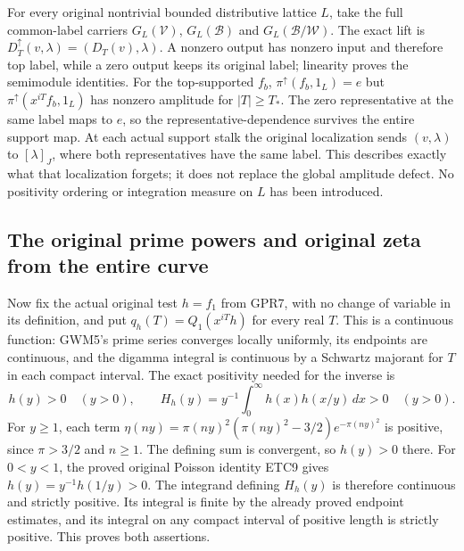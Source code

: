 For every original nontrivial bounded distributive lattice
$L$, take the full common-label carriers
$G_L(\mathcal V)$, $G_L(\mathcal B)$ and
$G_L(\mathcal B/\mathcal W)$.
The exact lift is
$D_T^\uparrow(v,\lambda)=(D_T(v),\lambda)$.
A nonzero output has nonzero input and therefore top
label, while a zero output keeps its original label;
linearity proves the semimodule identities.
For the top-supported $f_b$, $\pi^\uparrow(f_b,1_L)=e$
but
$\pi^\uparrow(x^{iT}f_b,1_L)$ has nonzero amplitude for
$|T|\ge T_*$. The zero representative at the same label
maps to $e$, so the representative-dependence survives
the entire support map. At each actual support stalk
the original localization sends $(v,\lambda)$ to
$[\lambda]_J$, where both representatives have the
same label. This describes exactly what that localization
forgets; it does not replace the global amplitude defect.
No positivity ordering or integration measure on $L$
has been introduced.

\subsection{The original prime powers and original zeta from the entire curve}

Now fix the actual original test $h=f_1$ from GPR7, with no
change of variable in its definition, and put
$q_h(T)=Q_1(x^{iT}h)$ for every real $T$.
This is a continuous function: GWM5's prime series converges
locally uniformly, its endpoints are continuous, and the
digamma integral is continuous by a Schwartz majorant for
$T$ in each compact interval.
The exact positivity needed for the inverse is
\begin{equation}\tag{GPR13}
 h(y)>0\quad(y>0),\qquad
 H_h(y)=y^{-1}\int_0^\infty h(x)h(x/y)\,dx>0\quad(y>0).
\end{equation}
For $y\ge1$, each term
$\eta(ny)=\pi(ny)^2(\pi(ny)^2-3/2)e^{-\pi(ny)^2}$
is positive, since $\pi>3/2$ and $n\ge1$.
The defining sum is convergent, so $h(y)>0$ there.
For $0<y<1$, the proved original Poisson identity ETC9 gives
$h(y)=y^{-1}h(1/y)>0$.
The integrand defining $H_h(y)$ is therefore continuous
and strictly positive. Its integral is finite by the already
proved endpoint estimates, and its integral on any compact
interval of positive length is strictly positive.
This proves both assertions.


